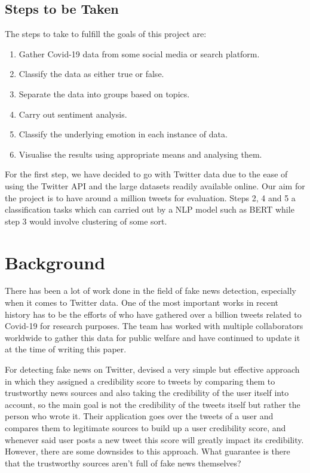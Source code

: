 \documentclass{l4proj}
\begin{document}
\section{Steps to be Taken}
The steps to take to fulfill the goals of this project are:

\vspace{0.4cm}
\begin{enumerate}
    \item
    Gather Covid-19 data from some social media or search platform.
    \item
    Classify the data as either true or false.
    \item
    Separate the data into groups based on topics.
    \item
    Carry out sentiment analysis.
    \item
    Classify the underlying emotion in each instance of data.
    \item
    Visualise the results using appropriate means and analysing them.
\end{enumerate}
\vspace{0.4cm}

For the first step, we have decided to go with Twitter data due to the ease of using the Twitter API and the large datasets readily available online. Our aim for the project is to have around a million tweets for evaluation. Steps 2, 4 and 5 a classification tasks which can carried out by a NLP model such as BERT while step 3 would involve clustering of some sort.

\chapter{Background}

There has been a lot of work done in the field of fake news detection, especially when it comes to Twitter data. One of the most important works in recent history has to be the efforts of \cite{banda_juan_m_2021_5652342} who have gathered over a billion tweets related to Covid-19 for research purposes. The team has worked with multiple collaborators worldwide to gather this data for public welfare and have continued to update it at the time of writing this paper.

For detecting fake news on Twitter, \cite{ATODIRESEI2018451} devised a very simple but effective approach in which they assigned a credibility score to tweets by comparing them to trustworthy news sources and also taking the credibility of the user itself into account, so the main goal is not the credibility of the tweets itself but rather the person who wrote it. Their application goes over the tweets of a user and compares them to legitimate sources to build up a user credibility score, and whenever said user posts a new tweet this score will greatly impact its credibility. However, there are some downsides to this approach. What guarantee is there that the trustworthy sources aren't full of fake news themselves?
\end{document}
